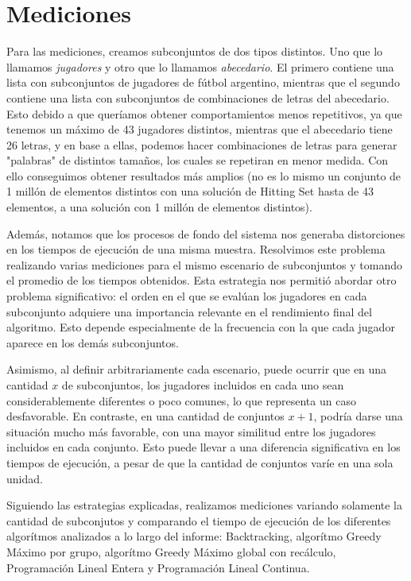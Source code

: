 \section{Mediciones}

Para las mediciones, creamos subconjuntos de dos tipos distintos. Uno que lo llamamos \textit{jugadores} y otro que lo llamamos \textit{abecedario}.
El primero contiene una lista con subconjuntos de jugadores de fútbol argentino, mientras que el segundo contiene una lista con subconjuntos de combinaciones de letras del abecedario. Esto debido a que queríamos obtener comportamientos menos repetitivos, ya que tenemos un máximo de 43 jugadores distintos, mientras que el abecedario tiene 26 letras, y en base a ellas, podemos hacer combinaciones de letras para generar "palabras" de distintos tamaños, los cuales se repetiran en menor medida.
Con ello conseguimos obtener resultados más amplios (no es lo mismo un conjunto de 1 millón de elementos distintos con una solución de Hitting Set hasta de 43 elementos, a una solución con 1 millón de elementos distintos).

Además, notamos que los procesos de fondo del sistema nos generaba distorciones en los tiempos de ejecución de una misma muestra. Resolvimos este problema
realizando varias mediciones para el mismo escenario de subconjuntos y tomando el promedio de los tiempos obtenidos. Esta estrategia nos permitió abordar otro problema significativo: el orden en el que se evalúan los jugadores en cada subconjunto adquiere una importancia relevante en el rendimiento final del algoritmo. Esto depende especialmente de la frecuencia con la que cada jugador aparece en los demás subconjuntos. 

Asimismo, al definir arbitrariamente cada escenario, puede ocurrir que en una cantidad 
$x$ de subconjuntos, los jugadores incluidos en cada uno sean considerablemente diferentes o poco comunes, lo que representa un caso desfavorable. En contraste, en una cantidad de conjuntos $x+1$, podría darse una situación mucho más favorable, con una mayor similitud entre los jugadores incluidos en cada conjunto. Esto puede llevar a una diferencia significativa en los tiempos de ejecución, a pesar de que la cantidad de conjuntos varíe en una sola unidad.

Siguiendo las estrategias explicadas, realizamos mediciones variando solamente la cantidad de subconjutos y comparando el tiempo de ejecución de los diferentes algorítmos analizados a lo largo del informe: Backtracking, algorítmo Greedy Máximo por grupo, algorítmo Greedy Máximo global con recálculo, Programación Lineal Entera y Programación Lineal Continua.

